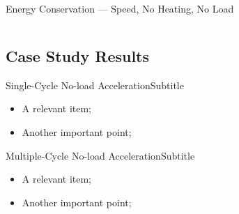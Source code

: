 \begin{frame}{Energy Conservation --- Speed, No Heating, No Load}
\begin{columns}
        \vspace*{-4mm}%

        \end{columns}
    \end{frame}

\subsection{Case Study Results}

    \begin{frame}{Single-Cycle No-load Acceleration}{Subtitle}\vspace*{-2em}
        \begin{itemize}
            \item<2->  A \alert{relevant} item;
            \item<3->  Another \alert{important} point;
        \end{itemize}
    \end{frame}

    \begin{frame}{Multiple-Cycle No-load Acceleration}{Subtitle}\vspace*{-2em}
        \begin{itemize}
            \item<2->  A \alert{relevant} item;
            \item<3->  Another \alert{important} point;
        \end{itemize}
    \end{frame}

